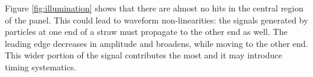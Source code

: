 Figure \ref{fig:illumination} 
shows that there are almost no hits in the central region of the panel. 
This could lead to waveform non-linearities: the signals generated by 
particles at one end of a straw must propagate to the other end as well. 
The leading edge decreases in amplitude and broadens, while moving to 
the other end. This wider portion of the signal contributes the most 
and it may introduce timing systematics.




